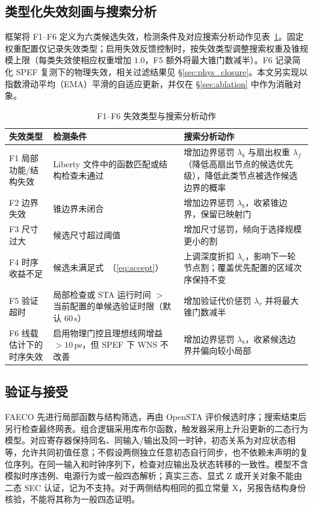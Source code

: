 \documentclass[twocolumn,10pt,fontset=windows]{ctexart}
\renewcommand{\eqref}[1]{\textup{（\ref{#1}）}}
\begin{document}
\subsection{类型化失效刻画与搜索分析}\label{sec:failure_char}

\FloatBarrier
框架将 F1--F6 定义为六类候选失效，检测条件及对应搜索分析动作见表~\ref{tab:failures}。固定权重配置仅记录失效类型；启用失效反馈控制时，按失效类型调整搜索权重及锥规模上限（每类失效使相应权重增加 $1.0$，F5 额外将最大锥门数减半）。F6 记录简化 SPEF 复测下的物理失效，相关过滤结果见 \S\ref{sec:phys_closure}。本文另实现以指数滑动平均（EMA）平滑的自适应更新，并仅在 \S\ref{sec:ablation} 中作为消融对象。

\begin{table}[!htbp]
\centering
\caption{F1--F6 失效类型与搜索分析动作}
\label{tab:failures}
\scriptsize
\setlength{\tabcolsep}{2pt}
\begin{tabular}{p{2.0cm}p{2.6cm}p{2.9cm}}
\toprule
\textbf{失效类型} & \textbf{检测条件} & \textbf{搜索分析动作} \\
\midrule
F1 局部功能/结构失效 & Liberty 文件中的函数匹配或结构检查未通过 & 增加边界惩罚 $\lambda_b$ 与扇出权重 $\lambda_f$（降低高扇出节点的候选优先级），降低此类节点被选作候选边界的概率 \\
F2 边界失效 & 锥边界未闭合 & 增加边界惩罚 $\lambda_b$，收紧锥边界，保留已映射门 \\
F3 尺寸过大 & 候选尺寸超过阈值 & 增加尺寸惩罚，倾向于选择规模更小的割 \\
F4 时序收益不足 & 候选未满足式~\eqref{eq:accept} & 上调深度折扣 $\lambda_c$，影响下一轮节点割；覆盖优先配置的区域次序保持不变 \\
F5 验证超时 & 局部检查或 STA 运行时间 $>$ 当前配置的单候选验证时限（默认 $60\,$s） & 增加验证代价惩罚 $\lambda_v$ 并将最大锥门数减半 \\
F6 线载估计下的时序失效 & 启用物理门控且理想线网增益 $>10\,$ps，但 SPEF 下 WNS 不改善 & 增加边界惩罚 $\lambda_b$，收紧候选边界并偏向较小局部 \\
\bottomrule
\end{tabular}
\end{table}

\subsection{验证与接受}\label{sec:validation}
FAECO 先进行局部函数与结构筛选，再由 OpenSTA 评价候选时序；搜索结束后另行检查最终网表。组合逻辑采用库布尔函数，触发器采用上升沿更新的二态行为模型。对应寄存器保持同名、同输入/输出及同一时钟，初态关系为对应状态相等，允许共同初值任意；不假设两侧独立任意初态自行同步，也不依赖未声明的复位序列。在同一输入和时钟序列下，检查对应输出及状态转移的一致性。模型不含模拟时序违例、电源行为或一般四态解析；真实三态、显式 Z 或开关对象不能由二态 SEC 认证，记为不支持。对于两侧结构相同的孤立常量 X，另报告结构身份核验，不能将其称为一般四态证明。
\end{document}
